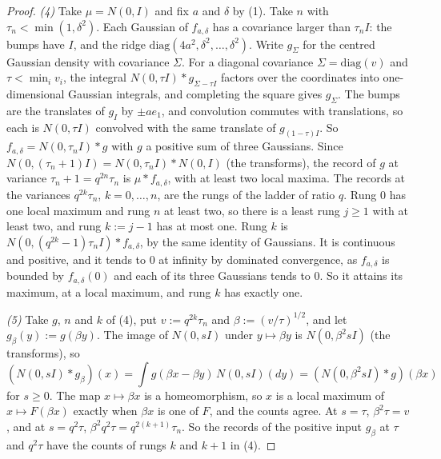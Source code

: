 \begin{proof}
\emph{(4)} Take $\mu = N(0, I)$ and fix $a$ and $\delta$ by (1). Take $n$ with
$\tau_n < \min(1, \delta^2)$. Each Gaussian of $f_{a,\delta}$ has a covariance larger than
$\tau_nI$: the bumps have $I$, and the ridge $\mathrm{diag}(4a^2, \delta^2, \dots, \delta^2)$. Write $g_\Sigma$ for the centred Gaussian density with covariance $\Sigma$. For a diagonal covariance $\Sigma = \mathrm{diag}(v)$ and $\tau < \min_iv_i$, the integral
$N(0, \tau I) * g_{\Sigma - \tau I}$ factors over the coordinates into one-dimensional Gaussian
integrals, and completing the square gives $g_\Sigma$. The bumps are the translates of $g_I$ by
$\pm ae_1$, and convolution commutes with translations, so each is $N(0, \tau I)$ convolved with
the same translate of $g_{(1 - \tau)I}$. So
$f_{a,\delta} = N(0, \tau_nI) * g$ with $g$ a positive sum of three Gaussians. Since
$N(0, (\tau_n + 1)I) = N(0, \tau_nI) * N(0, I)$ (the transforms), the record of $g$ at
variance $\tau_n + 1 = q^{2n}\tau_n$ is $\mu * f_{a,\delta}$, with at least two local maxima. The
records at the variances $q^{2k}\tau_n$, $k = 0, \dots, n$, are the rungs of the ladder of ratio
$q$.
Rung $0$ has one local maximum and rung $n$ at least two, so there is a least rung $j \ge 1$ with
at least two, and rung $k := j - 1$ has at most one. Rung $k$ is
$N(0, (q^{2k} - 1)\tau_nI) * f_{a,\delta}$, by the same identity of Gaussians. It is continuous and
positive, and it tends to $0$ at infinity by dominated convergence, as $f_{a,\delta}$ is bounded by
$f_{a,\delta}(0)$ and each of its three Gaussians tends to $0$. So it attains its
maximum, at a local maximum, and rung $k$ has exactly one.

\emph{(5)} Take $g$, $n$ and $k$ of (4), put $v := q^{2k}\tau_n$ and $\beta := (v/\tau)^{1/2}$, and
let $g_\beta(y) := g(\beta y)$. The image of $N(0, sI)$ under $y \mapsto \beta y$ is $N(0, \beta^2sI)$ (the
transforms), so
\[
  (N(0, sI) * g_\beta)(x) = \int g(\beta x - \beta y)\,N(0, sI)(dy) = (N(0, \beta^2sI) * g)(\beta x)
\]
for $s \ge 0$. The map $x \mapsto \beta x$ is a homeomorphism, so $x$ is a local maximum of
$x \mapsto F(\beta x)$ exactly when $\beta x$ is one of $F$, and the counts agree. At $s = \tau$,
$\beta^2\tau = v$, and at $s = q^2\tau$, $\beta^2q^2\tau = q^{2(k+1)}\tau_n$. So the records of the
positive input $g_\beta$ at $\tau$ and $q^2\tau$ have the counts of rungs $k$ and $k + 1$ in (4).
\end{proof}

